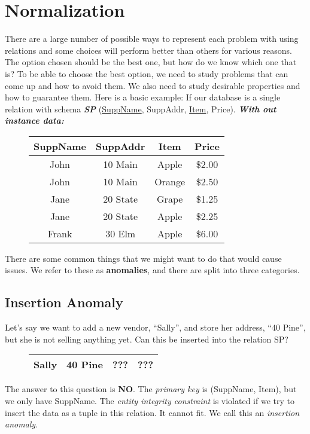 \documentclass{report}
\begin{document}
    \section{Normalization}
    There are a large number of possible ways to represent each problem with using relations and some choices will perform better than others for various reasons. The option chosen should be the best one, but how do we know which one that is?
    \bigbreak \noindent
    To be able to choose the best option, we need to study problems that can come up and how to avoid them. We also need to study desirable properties and how to guarantee them. Here is a basic example:
    \bigbreak \noindent
    If our database is a single relation with schema \textit{\textbf{SP}} (\underline{SuppName}, SuppAddr, \underline{Item}, Price).
    \bigbreak \noindent
    \textit{\textbf{With out instance data:}}
    \begin{figure}[H]
    \centering
    \setlength{\tabcolsep}{30}
    \begin{tabular}{c c c c}
        \hline
        SuppName & SuppAddr & Item & Price \\
        \hline
        John & 10 Main & Apple & \$2.00 \\
        \hline
        John & 10 Main & Orange & \$2.50 \\
        \hline
        Jane & 20 State & Grape & \$1.25 \\
        \hline
        Jane & 20 State & Apple & \$2.25 \\
        \hline
        Frank & 30 Elm & Apple & \$6.00  \\
        \hline
    \end{tabular}
    \end{figure}
    \bigbreak \noindent
    There are some common things that we might want to do that would cause issues. We refer to these as \textbf{anomalies}, and there are split into three categories.
    \subsection*{Insertion Anomaly}
    Let's say we want to add a new vendor, ``Sally'', and store her address, ``40 Pine'', but she is not selling anything yet. Can this be inserted into the relation SP?
    \begin{figure}[ht]
    \centering
    \setlength{\tabcolsep}{39}
    \begin{tabular}{c c c c}
        \hline
        Sally & 40 Pine & ???  & ??? \\
        \hline
    \end{tabular}
    \end{figure}
    \bigbreak\noindent The answer to this question is \textbf{NO}. The \textit{primary key} is (SuppName, Item), but we only have SuppName. The \textit{entity integrity constraint} is violated if we try to insert the data as a tuple in this relation. It cannot fit. We call this an \textit{insertion anomaly}.
\end{document}
